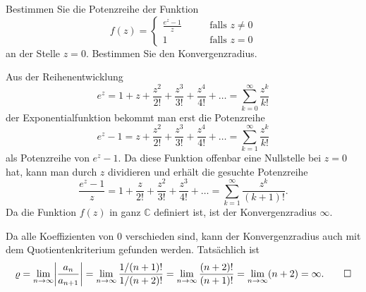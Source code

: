 Bestimmen Sie die Potenzreihe der Funktion
\[
f(z)
=
\begin{cases}
\displaystyle \frac{e^z - 1}{z} & \qquad\text{falls $z\ne 0$}\\
              1                 & \qquad\text{falls $z=0$}
\end{cases}
\]
an der Stelle $z=0$.
Bestimmen Sie den Konvergenzradius.

\begin{loesung}
Aus der Reihenentwicklung
\[
e^z
=
1 + z + \frac{z^2}{2!} + \frac{z^3}{3!} + \frac{z^4}{4!} + \dots
=
\sum_{k=0}^\infty \frac{z^k}{k!}
\]
der Exponentialfunktion bekommt man erst die Potenzreihe
\[
e^z - 1
=
z + \frac{z^2}{2!} + \frac{z^3}{3!} + \frac{z^4}{4!} + \dots
=
\sum_{k=1}^\infty \frac{z^k}{k!}
\]
als Potenzreihe von $e^z-1$.
Da diese Funktion offenbar eine Nullstelle bei $z=0$ hat, kann man
durch $z$ dividieren und erhält die gesuchte Potenzreihe
\[
\frac{e^z - 1}{z}
=
1 + \frac{z}{2!} + \frac{z^2}{3!} + \frac{z^3}{4!} + \dots
=
\sum_{k=1}^\infty
\frac{z^k}{(k+1)!}.
\]
Da die Funktion $f(z)$ in ganz $\mathbb{C}$ definiert ist, ist
der Konvergenzradius $\infty$.

Da alle Koeffizienten von $0$ verschieden sind, kann der
Konvergenzradius auch mit dem Quotientenkriterium gefunden werden.
Tatsächlich ist
\[
\varrho
=
\lim_{n\to\infty}
\biggl|\frac{a_n}{a_{n+1}}\biggr|
=
\lim_{n\to\infty}
\frac{1/(n+1)!}{1/(n+2)!}
=
\lim_{n\to\infty}
\frac{(n+2)!}{(n+1)!}
=
\lim_{n\to\infty}
(n+2)
=
\infty.
\qedhere
\]
\end{loesung}
